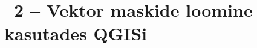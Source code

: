 
\clearpage %

\label{chapter:appendix-vektor-maskide-loomine}
\chapter*{\appendixTitle~2 -- Vektor maskide loomine kasutades QGISi}
